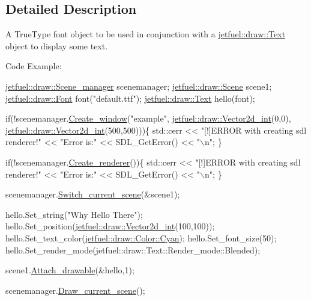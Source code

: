 \subsection{Detailed Description}
A True\+Type font object to be used in conjunction with a \hyperlink{classjetfuel_1_1draw_1_1Text}{jetfuel\+::draw\+::\+Text} object to display some text.

Code Example\+: 
\begin{DoxyCode}
\hyperlink{classjetfuel_1_1draw_1_1Scene__manager}{jetfuel::draw::Scene\_manager} scenemanager;
\hyperlink{classjetfuel_1_1draw_1_1Scene}{jetfuel::draw::Scene} scene1;
\hyperlink{classjetfuel_1_1draw_1_1Font}{jetfuel::draw::Font} font(\textcolor{stringliteral}{"default.ttf"});
\hyperlink{classjetfuel_1_1draw_1_1Text}{jetfuel::draw::Text} hello(font);

\textcolor{keywordflow}{if}(!scenemanager.\hyperlink{classjetfuel_1_1draw_1_1Scene__manager_a5113e9062c272a22d383ba872417ba31}{Create\_window}(\textcolor{stringliteral}{"example"},
                         \hyperlink{classjetfuel_1_1draw_1_1Vector2d}{jetfuel::draw::Vector2d\_int}(0,0),
                         \hyperlink{classjetfuel_1_1draw_1_1Vector2d}{jetfuel::draw::Vector2d\_int}(500,500)))\{
   std::cerr << \textcolor{stringliteral}{"[!]ERROR with creating sdl renderer!"} <<
   \textcolor{stringliteral}{"Error is:"} << SDL\_GetError() << \textcolor{stringliteral}{"\(\backslash\)n"};
\}

\textcolor{keywordflow}{if}(!scenemanager.\hyperlink{classjetfuel_1_1draw_1_1Scene__manager_afafecd926ce5e4b2543a6d583a7d24b6}{Create\_renderer}())\{
   std::cerr << \textcolor{stringliteral}{"[!]ERROR with creating sdl renderer!"} <<
   \textcolor{stringliteral}{"Error is:"} << SDL\_GetError() << \textcolor{stringliteral}{"\(\backslash\)n"};
\}

scenemanager.\hyperlink{classjetfuel_1_1draw_1_1Scene__manager_a770c163b88ba8427539ee182315ea989}{Switch\_current\_scene}(&scene1);

hello.Set\_string(\textcolor{stringliteral}{"Why Hello There"});
hello.Set\_position(\hyperlink{classjetfuel_1_1draw_1_1Vector2d}{jetfuel::draw::Vector2d\_int}(100,100));
hello.Set\_text\_color(\hyperlink{classjetfuel_1_1draw_1_1Color_a9c9781b9377310494e8af2a5fe524ab4}{jetfuel::draw::Color::Cyan});
hello.Set\_font\_size(50);
hello.Set\_render\_mode(jetfuel::draw::Text::Render\_mode::Blended);

scene1.\hyperlink{classjetfuel_1_1draw_1_1Scene_aea4b4c4ae25c30d661be4c52787e0ea3}{Attach\_drawable}(&hello,1);

scenemanager.\hyperlink{classjetfuel_1_1draw_1_1Scene__manager_a8af9a3abfd5121b1b8556342de435773}{Draw\_current\_scene}();
\end{DoxyCode}
 

